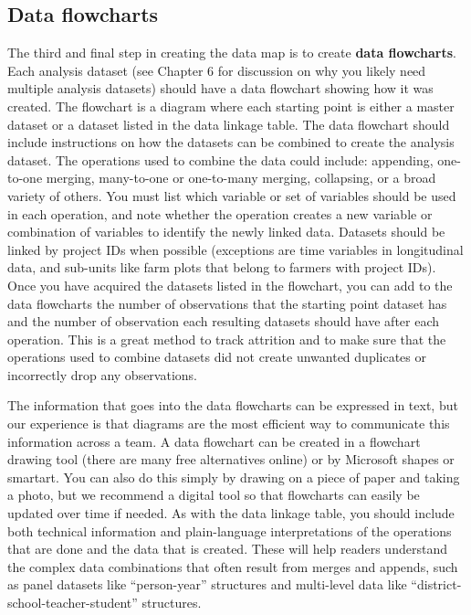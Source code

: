 \subsection{Data flowcharts}

The third and final step in creating the data map is
to create \textbf{data flowcharts}.
Each analysis dataset
(see Chapter 6 for discussion on why you likely need multiple analysis datasets)
should have a data flowchart showing how it was created.
The flowchart is a diagram
where each starting point is either a master dataset
or a dataset listed in the data linkage table.
The data flowchart should include instructions on how
the datasets can be combined to create the analysis dataset.
The operations used to combine the data could include:
appending, one-to-one merging,
many-to-one or one-to-many merging, collapsing, or a broad variety of others.
You must list which variable or set of variables
should be used in each operation,
and note whether the operation creates a new variable or combination of variables
to identify the newly linked data.
Datasets should be linked by project IDs when possible
(exceptions are time variables in longitudinal data,
and sub-units like farm plots that belong to farmers with project IDs).
Once you have acquired the datasets listed in the flowchart,
you can add to the data flowcharts the number of observations that
the starting point dataset has
and the number of observation each resulting datasets
should have after each operation.
This is a great method to track attrition and to make sure that
the operations used to combine datasets did not create unwanted duplicates
or incorrectly drop any observations.

The information that goes into the data flowcharts can be expressed in text,
but our experience is that diagrams are the most efficient way to communicate this information across a team.
A data flowchart can be created in a flowchart drawing tool
(there are many free alternatives online) or
by Microsoft shapes or smartart.
You can also do this simply by drawing on a piece of paper and taking a photo,
but we recommend a digital tool
so that flowcharts can easily be updated over time if needed.
As with the data linkage table,
you should include both technical information
and plain-language interpretations
of the operations that are done and the data that is created.
These will help readers understand the complex data combinations
that often result from merges and appends,
such as panel datasets like ``person-year'' structures
and multi-level data like ``district-school-teacher-student'' structures.

